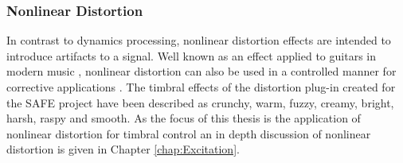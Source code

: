 		\subsubsection*{Nonlinear Distortion}
			In contrast to dynamics processing, nonlinear distortion effects are intended to introduce
			artifacts to a signal. Well known as an effect applied to guitars in modern music
			\citep{yeh2009digital}, nonlinear distortion can also be used in a controlled manner for corrective
			applications \citep{larsen2004audio}. The timbral effects of the distortion plug-in created for the
			SAFE project have been described as crunchy, warm, fuzzy, creamy, bright, harsh, raspy and smooth.
			As the focus of this thesis is the application of nonlinear distortion for timbral control an in
			depth discussion of nonlinear distortion is given in Chapter \ref{chap:Excitation}. 

